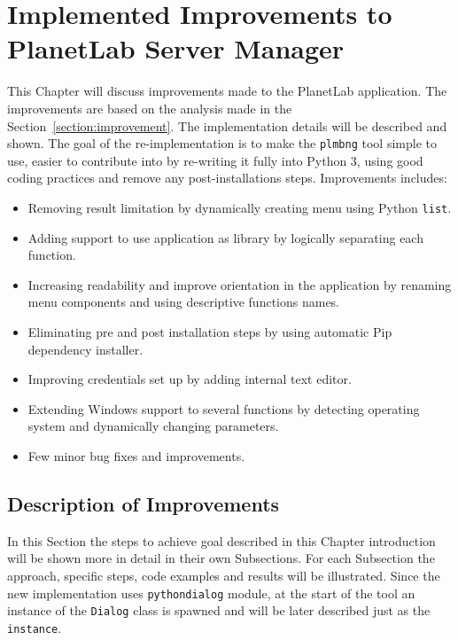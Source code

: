 \chapter{Implemented Improvements to PlanetLab Server Manager}
\label{chapter:improve}
This Chapter will discuss improvements made to the PlanetLab application. The improvements are based on the analysis made in the Section~\ref{section:improvement}. The implementation details will be described and shown. The goal of the re-implementation is to make the \texttt{plmbng} tool simple to use, easier to contribute into by re-writing it fully into Python 3, using good coding practices and remove any post-installations steps. Improvements includes:
\begin{itemize}
	\item Removing result limitation by dynamically creating menu using Python \texttt{list}.
	\item Adding support to use application as library by logically separating each function.
	\item Increasing readability and improve orientation in the application by renaming menu components and using descriptive functions names.
	\item Eliminating pre and post installation steps by using automatic Pip dependency installer.
	\item Improving credentials set up by adding internal text editor.
	\item Extending Windows support to several functions by detecting operating system and dynamically changing parameters.
	\item Few minor bug fixes and improvements.
\end{itemize}

\section{Description of Improvements}
\label{section:implementapproach}
In this Section the steps to achieve goal described in this Chapter introduction will be shown more in detail in their own Subsections. For each Subsection the approach, specific steps, code examples and results will be illustrated. Since the new implementation uses \texttt{pythondialog} module, at the start of the tool an instance of the \texttt{Dialog} class is spawned and will be later described just as the \texttt{instance}.
